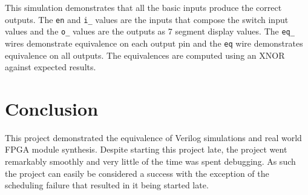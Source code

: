 \documentclass[12pt,letterpaper,titlepage]{article}
\begin{document}
\begin{raggedright}
\begin{center}
\end{center}

This simulation demonstrates that all the basic inputs produce the correct outputs. The \texttt{en} and \texttt{i\_} values are the inputs that compose the switch input values and the \texttt{o\_} values are the outputs as 7 segment display values. The \texttt{eq\_} wires demonstrate equivalence on each output pin and the \texttt{eq} wire demonstrates equivalence on all outputs. The equivalences are computed using an XNOR against expected results.

\section{Conclusion}

This project demonstrated the equivalence of Verilog simulations and real world FPGA module synthesis. Despite starting this project late, the project went remarkably smoothly and very little of the time was spent debugging. As such the project can easily be considered a success with the exception of the scheduling failure that resulted in it being started late.

\end{raggedright}
\end{document}

